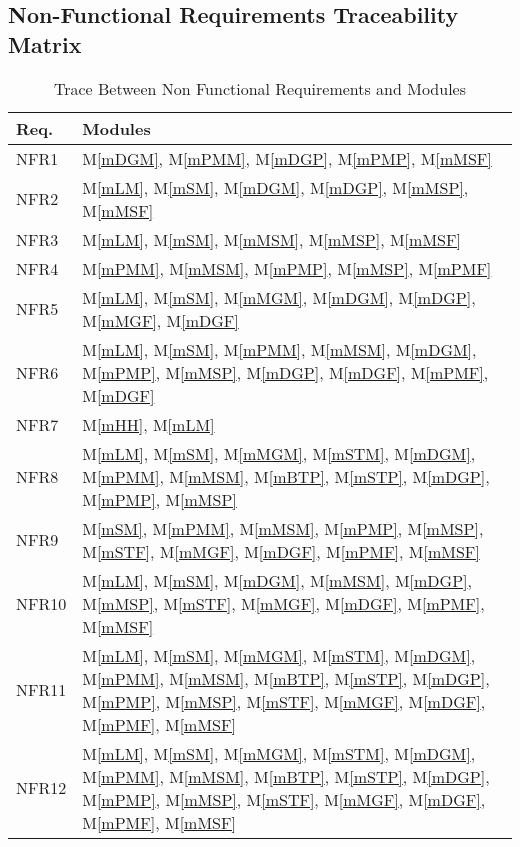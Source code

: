 \documentclass[12pt, titlepage]{article}
\newcommand{\mref}[1]{M\ref{#1}}
\begin{document}
\newpage

\subsection{Non-Functional Requirements Traceability Matrix}
\begin{table}[H]
\centering
\begin{tabular}{p{} p{}}
\toprule
\textbf{Req.} & \textbf{Modules}\\
\midrule
NFR1 & \mref{mDGM}, \mref{mPMM}, \mref{mDGP}, \mref{mPMP}, \mref{mMSF}\\
NFR2 & \mref{mLM}, \mref{mSM}, \mref{mDGM}, \mref{mDGP}, \mref{mMSP}, \mref{mMSF}\\
NFR3 & \mref{mLM}, \mref{mSM}, \mref{mMSM}, \mref{mMSP}, \mref{mMSF}\\
NFR4 & \mref{mPMM}, \mref{mMSM}, \mref{mPMP}, \mref{mMSP}, \mref{mPMF}\\
NFR5 & \mref{mLM}, \mref{mSM}, \mref{mMGM}, \mref{mDGM}, \mref{mDGP}, \mref{mMGF}, \mref{mDGF}\\
NFR6 & \mref{mLM}, \mref{mSM}, \mref{mPMM}, \mref{mMSM}, \mref{mDGM}, \mref{mPMP}, \mref{mMSP}, \mref{mDGP}, \mref{mDGF}, \mref{mPMF}, \mref{mDGF}\\
NFR7 & \mref{mHH}, \mref{mLM}\\
NFR8 & \mref{mLM}, \mref{mSM}, \mref{mMGM}, \mref{mSTM}, \mref{mDGM}, \mref{mPMM}, \mref{mMSM}, \mref{mBTP}, \mref{mSTP}, \mref{mDGP}, \mref{mPMP}, \mref{mMSP} \\
NFR9 & \mref{mSM}, \mref{mPMM}, \mref{mMSM}, \mref{mPMP}, \mref{mMSP}, \mref{mSTF}, \mref{mMGF}, \mref{mDGF}, \mref{mPMF}, \mref{mMSF} \\
NFR10 & \mref{mLM}, \mref{mSM}, \mref{mDGM}, \mref{mMSM}, \mref{mDGP}, \mref{mMSP}, \mref{mSTF}, \mref{mMGF}, \mref{mDGF}, \mref{mPMF}, \mref{mMSF} \\
NFR11 & \mref{mLM}, \mref{mSM}, \mref{mMGM}, \mref{mSTM}, \mref{mDGM}, \mref{mPMM}, \mref{mMSM}, \mref{mBTP}, \mref{mSTP}, \mref{mDGP}, \mref{mPMP}, \mref{mMSP}, \mref{mSTF}, \mref{mMGF}, \mref{mDGF}, \mref{mPMF}, \mref{mMSF} \\
NFR12 & \mref{mLM}, \mref{mSM}, \mref{mMGM}, \mref{mSTM}, \mref{mDGM}, \mref{mPMM}, \mref{mMSM}, \mref{mBTP}, \mref{mSTP}, \mref{mDGP}, \mref{mPMP}, \mref{mMSP}, \mref{mSTF}, \mref{mMGF}, \mref{mDGF}, \mref{mPMF}, \mref{mMSF} \\
\bottomrule
\end{tabular}
\caption{Trace Between Non Functional Requirements and Modules}
\label{TblNFRT}
\end{table}
\end{document}
